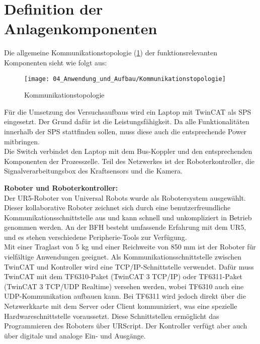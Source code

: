 \section{Definition der Anlagenkomponenten} \label{Anlagenkomponenten}
	Die allgemeine Kommunikationstopologie (\ref{fig:Kommunikationstopologie}) der funktionsrelevanten Komponenten sieht wie folgt aus: 
	
	\begin{figure}[h!]
		\centering
		\texttt{[image: 04\_Anwendung\_und\_Aufbau/Kommunikationstopologie]}
		\captionsetup{justification=centering}
		\caption{Kommunikationstopologie}
		\label{fig:Kommunikationstopologie}
	\end{figure}
	
	Für die Umsetzung des Versuchsaufbaus wird ein Laptop mit TwinCAT als SPS eingesetzt. Der Grund dafür ist die Leistungsfähigkeit. Da alle Funktionalitäten innerhalb der SPS stattfinden sollen, muss diese auch die entsprechende Power mitbringen. 
	\\
	Die Switch verbindet den Laptop mit dem Bus-Koppler und den entsprechenden Komponenten der Prozesszelle. Teil des Netzwerkes ist der Roboterkontroller, die Signalverarbeitungsbox des Kraftsensors und die Kamera. 
	
	\textbf{Roboter und Roboterkontroller:}
	\vspace{2mm} 
	\\
	Der UR5-Roboter von Universal Robots wurde als Robotersystem ausgewählt. Dieser kollaborative Roboter zeichnet sich durch eine benutzerfreundliche Kommunikationsschnittstelle aus und kann schnell und unkompliziert in Betrieb genommen werden. An der BFH besteht umfassende Erfahrung mit dem UR5, und es stehen verschiedene Peripherie-Tools zur Verfügung.
	\\
	Mit einer Traglast von 5 kg und einer Reichweite von 850 mm ist der Roboter für vielfältige Anwendungen geeignet. Als Kommunikationsschnittstelle zwischen TwinCAT und Kontroller wird eine TCP/IP-Schnittstelle verwendet. Dafür muss TwinCAT mit dem TF6310-Paket (TwinCAT 3 TCP/IP) oder TF6311-Paket (TwinCAT 3 TCP/UDP Realtime) versehen werden, wobei TF6310 auch eine UDP-Kommunikation aufbauen kann. Bei TF6311 wird jedoch direkt über die Netzwerkkarte mit dem Server oder Client kommuniziert, was eine spezielle Hardwareschnittstelle voraussetzt. Diese Schnittstellen ermöglicht das Programmieren des Roboters über URScript. Der Kontroller verfügt aber auch über digitale und analoge Ein- und Ausgänge. 
	
